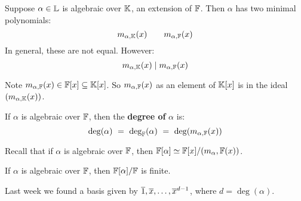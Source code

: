 \begin{thm}
    Suppose $ \alpha \in \mathbb{L} $ is algebraic over $ \mathbb{K} $, an extension of
    $ \mathbb{F} $. Then $ \alpha $ has two minimal polynomials:
    \begin{equation*}
        m_{\alpha, \mathbb{K}}(x) \qquad m_{\alpha, \mathbb{F}}(x)
    \end{equation*}
    In general, these are not equal. However:
    \begin{equation*}
        m_{\alpha, \mathbb{K}}(x) \mid m_{\alpha, \mathbb{F}}(x)
    \end{equation*}
\end{thm}

\begin{pf}[source=Primary Source Material]
    Note $ m_{\alpha, \mathbb{F}}(x) \in \mathbb{F}[x] \subseteq \mathbb{K}[x] $.
    So $ m_{\alpha, \mathbb{F}}(x) $ as an element of $ \mathbb{K}[x] $ is in the ideal
    $ (m_{\alpha, \mathbb{K}}(x)) $.
\end{pf}

\begin{defn}
    If $ \alpha $ is algebraic over $ \mathbb{F} $, then the \textbf{degree of}
    $ \alpha $ is:
    \begin{equation*}
        \deg(\alpha) \ = \ \deg_{\bb{F}}(\alpha) \ = \
        \deg(m_{\alpha, \bb{F}}(x))
    \end{equation*}
\end{defn}

Recall that if $ \alpha $ is algebraic over $ \mathbb{F} $, then $ \mathbb{F}[\alpha]
\simeq \mathbb{F}[x]/(m_{\alpha}, \mathbb{F}(x)) $.

\begin{thm}
    If $ \alpha $ is algebraic over $ \mathbb{F} $, then $ \mathbb{F}[\alpha]/\mathbb{F} $ is
    finite.
\end{thm}
Last week we found a basis given by $ \overline{1}, \overline{x}, \dots,
\overline{x}^{d-1} $, where $ d = \deg(\alpha) $.


